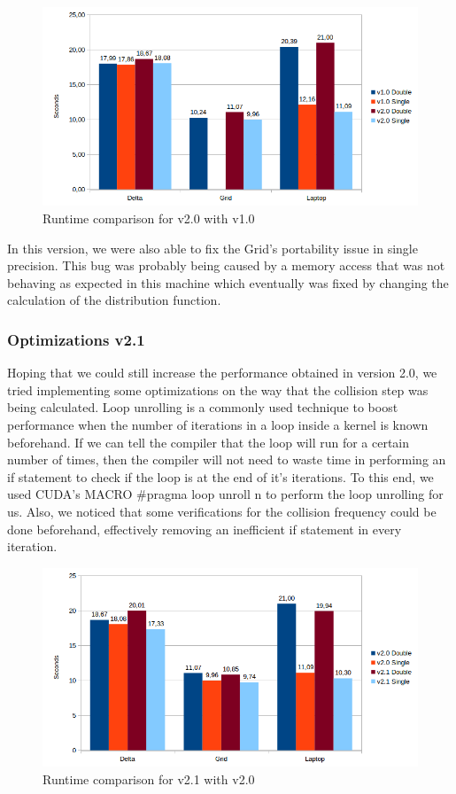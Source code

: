 \documentclass[12pt, openany]{book}
\begin{document}
  \begin{figure}[H]
  	\centering
  	\includegraphics[width=\linewidth]{Resources/Images/v2.png}
  	\caption{Runtime comparison for v2.0 with v1.0}
  	\label{fig:v2}
  \end{figure}
  

  In this version, we were also able to fix the Grid's portability issue in single precision. This bug was probably being caused by a memory access that was not behaving as expected in this machine which eventually was fixed by changing the calculation of the distribution function.

\subsubsection{Optimizations v2.1}
Hoping that we could still increase the performance obtained in version 2.0, we tried implementing some optimizations on the way that the collision step was being calculated. Loop unrolling is a commonly used technique to boost performance when the number of iterations in a loop inside a kernel is known beforehand. If we can tell the compiler that the loop will run for a certain number of times, then the compiler will not need to waste time in performing an if statement to check if the loop is at the end of it's iterations. To this end, we used CUDA's MACRO \#pragma loop unroll n to perform the loop unrolling for us. Also, we noticed that some verifications for the collision frequency could be done beforehand, effectively removing an inefficient if statement in every iteration.

  \begin{figure}[H]
  	\centering
  	\includegraphics[width=\linewidth]{Resources/Images/v21.png}
  	\caption{Runtime comparison for v2.1 with v2.0}
  	\label{fig:v21}
  \end{figure}
  
\end{document}
